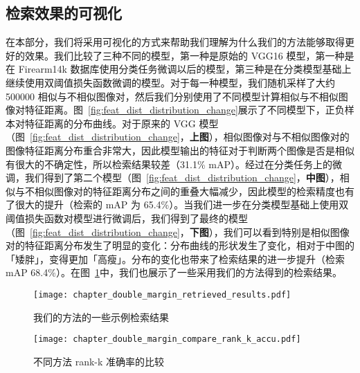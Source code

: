 \subsection{检索效果的可视化}
在本部分，我们将采用可视化的方式来帮助我们理解为什么我们的方法能够取得更好的效果。我们比较了三种不同的模型，第一种是原始的 VGG16 模型，第一种是在 Firearm14k 数据库使用分类任务微调以后的模型，第三种是在分类模型基础上继续使用双阈值损失函数微调的模型。对于每一种模型，我们随机采样了大约 500000 相似与不相似图像对，然后我们分别使用了不同模型计算相似与不相似图像对特征距离。图~\ref{fig:feat_dist_distribution_change}展示了不同模型下，正负样本对特征距离的分布曲线。对于原来的 VGG 模型（图~\ref{fig:feat_dist_distribution_change}，\textbf{上图}），相似图像对与不相似图像对的图像特征距离分布重合非常大，因此模型输出的特征对于判断两个图像是否是相似有很大的不确定性，所以检索结果较差（31.1\% mAP）。经过在分类任务上的微调，我们得到了第二个模型（图~\ref{fig:feat_dist_distribution_change}，\textbf{中图}），相似与不相似图像对的特征距离分布之间的重叠大幅减少，因此模型的检索精度也有了很大的提升（检索的 mAP 为 65.4\%）。当我们进一步在分类模型基础上使用双阈值损失函数对模型进行微调后，我们得到了最终的模型（图~\ref{fig:feat_dist_distribution_change}，\textbf{下图}），我们可以看到特别是相似图像对的特征距离分布发生了明显的变化：分布曲线的形状发生了变化，相对于中图的「矮胖」，变得更加「高瘦」。分布的变化也带来了检索结果的进一步提升（检索 mAP 68.4\%）。在图~\ref{fig:double_margin_retrieval_result}中，我们也展示了一些采用我们的方法得到的检索结果。

\begin{figure}[t]
	\centering
	\texttt{[image: chapter\_double\_margin\_retrieved\_results.pdf]}
	\caption{我们的方法的一些示例检索结果}
	\label{fig:double_margin_retrieval_result}
\end{figure}


\begin{figure}[t]
	\centering
	\texttt{[image: chapter\_double\_margin\_compare\_rank\_k\_accu.pdf]}
	\caption{不同方法 rank-k 准确率的比较}
	\label{fig:rank_k_accuracy_compare}
\end{figure}

